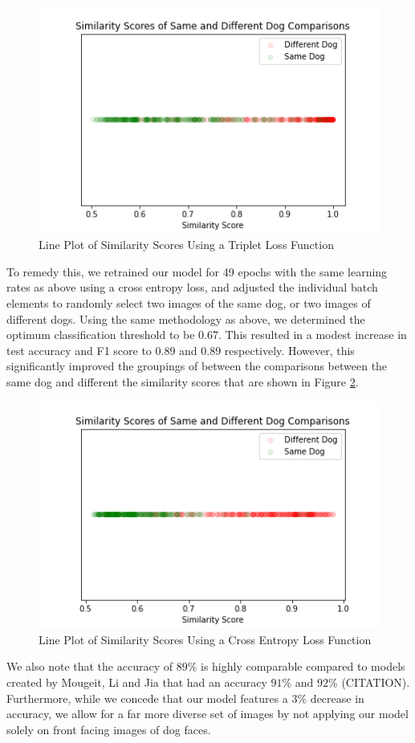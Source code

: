 \documentclass{article}
\begin{document}
\begin{figure}[h]
\centering
	\includegraphics[scale=0.7]{final-report-images/triplet_lineplot.png}
\caption{Line Plot of Similarity Scores Using a Triplet Loss Function}
\label{fig:x triplet lineplot}
\end{figure}
To remedy this, we retrained our model for 49 epochs with the same learning rates as above using a cross entropy loss, and adjusted the individual batch elements to randomly select two images of the same dog, or two images of different dogs.  Using the same methodology as above, we determined the optimum classification threshold to be 0.67.  This resulted in a modest increase in test accuracy and F1 score to 0.89 and 0.89 respectively.  However, this significantly improved the groupings of between the comparisons between the same dog and different the similarity scores that are shown in Figure \ref{fig:x triplet lineplot}. 

\begin{figure}[h]
\centering
	\includegraphics[scale=0.7]{final-report-images/crossentropy_lineplot.png}
\caption{Line Plot of Similarity Scores Using a Cross Entropy Loss Function}
\label{fig:x triplet lineplot}
\end{figure}
\noident We also note that the accuracy of $89\%$ is highly comparable compared to models created by Mougeit, Li and Jia that had an accuracy $91\%$ and $92\%$ (CITATION).  Furthermore, while we concede that our model features a $3\%$ decrease in accuracy, we allow for a far more diverse set of images by not applying our model solely on front facing images of dog faces.
\end{document}
